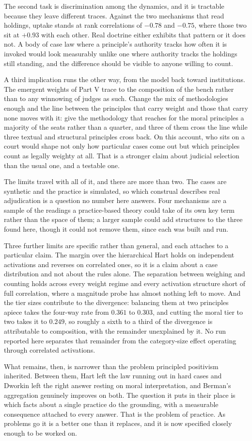 The second task is discrimination among the dynamics, and it is tractable
because they leave different traces. Against the two mechanisms
that read holdings, uptake stands at rank correlations of $-0.78$ and
$-0.75$, where those two sit at $+0.93$ with each other. Real doctrine either exhibits that pattern
or it does not. A body of case law where a principle's authority tracks
how often it is invoked would look measurably unlike one where
authority tracks the holdings still standing, and the difference should be
visible to anyone willing to count.

A third implication runs the other way, from the model back toward
institutions. The emergent weights of Part V trace to the composition of the
bench rather than to any winnowing of judges as such. Change the mix of
methodologies enough and the line between the principles that carry weight and
those that carry none moves with it: give the methodology that reaches for the
moral principles a majority of the seats rather than a quarter, and three of
them cross the line while three textual and structural principles cross back. On this account, who sits on a court
would shape not only how particular cases come out but which principles
count as legally weighty at all. That is a stronger claim about judicial
selection than the usual one, and a testable one.

The limits travel with all of it, and there are more than two. The cases
are synthetic and the practice is simulated, so which construal describes real
adjudication is a question no number here answers. Four
mechanisms are a sample of the readings a practice-based theory could take
of its own key term rather than the space of them; a larger sample could
add structures to the three found here, though it could not remove them,
since each was built and run.

Three further limits are specific rather than general, and each attaches to
a particular claim. The margin over the hierarchical Hart holds on independent
activations
and reverses on correlated ones, so it is a claim about a case distribution
and not about the rules alone. The separation between weighing and counting
holds across every weight regime and every activation structure short of
full correlation, where a magnitude probe has almost nothing left to move.
And the tier sizes contribute to the divergence: balancing them at two
principles apiece takes the four-way rate from $0.361$ to $0.303$, and
cutting the moral tier to two takes it to $0.249$, so roughly a sixth to a
third of the divergence is attributable to composition, with the remainder
unexplained by it. No run reported here separates that remainder from the
category-size effect operating through correlated activations.

What remains, then, is narrower than the problem principled positivism
inherited. Between them, Hart left the law running out in hard cases and Dworkin left
the right answer resting on moral interpretation, and Berman's aggregation
genuinely improves on both. The question it puts in their place is which
facts about a single practice do the grounding, with a measurable
consequence attached to every answer. That is the problem of practice. As problems go it is a better one than it replaces, and it is now specified
closely enough to be worked on.
